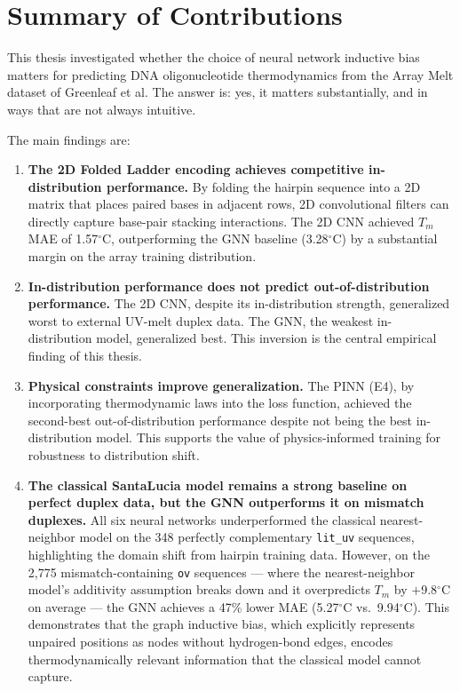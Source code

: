 \documentclass[12pt,oneside,letterpaper]{report}
\begin{document}
\section{Summary of Contributions}

This thesis investigated whether the choice of neural network inductive bias matters for predicting DNA oligonucleotide thermodynamics from the Array Melt dataset of Greenleaf et al. The answer is: yes, it matters substantially, and in ways that are not always intuitive.

The main findings are:

\begin{enumerate}
    \item \textbf{The 2D Folded Ladder encoding achieves competitive in-distribution performance.} By folding the hairpin sequence into a 2D matrix that places paired bases in adjacent rows, 2D convolutional filters can directly capture base-pair stacking interactions. The 2D CNN achieved $T_m$ MAE of 1.57$^\circ$C, outperforming the GNN baseline (3.28$^\circ$C) by a substantial margin on the array training distribution.

    \item \textbf{In-distribution performance does not predict out-of-distribution performance.} The 2D CNN, despite its in-distribution strength, generalized worst to external UV-melt duplex data. The GNN, the weakest in-distribution model, generalized best. This inversion is the central empirical finding of this thesis.

    \item \textbf{Physical constraints improve generalization.} The PINN (E4), by incorporating thermodynamic laws into the loss function, achieved the second-best out-of-distribution performance despite not being the best in-distribution model. This supports the value of physics-informed training for robustness to distribution shift.

    \item \textbf{The classical SantaLucia model remains a strong baseline on perfect duplex data, but the GNN outperforms it on mismatch duplexes.} All six neural networks underperformed the classical nearest-neighbor model on the 348 perfectly complementary \texttt{lit\_uv} sequences, highlighting the domain shift from hairpin training data. However, on the 2,775 mismatch-containing \texttt{ov} sequences --- where the nearest-neighbor model's additivity assumption breaks down and it overpredicts $T_m$ by $+$9.8$^\circ$C on average --- the GNN achieves a 47\% lower MAE (5.27$^\circ$C vs.\ 9.94$^\circ$C). This demonstrates that the graph inductive bias, which explicitly represents unpaired positions as nodes without hydrogen-bond edges, encodes thermodynamically relevant information that the classical model cannot capture.
\end{enumerate}
\end{document}
